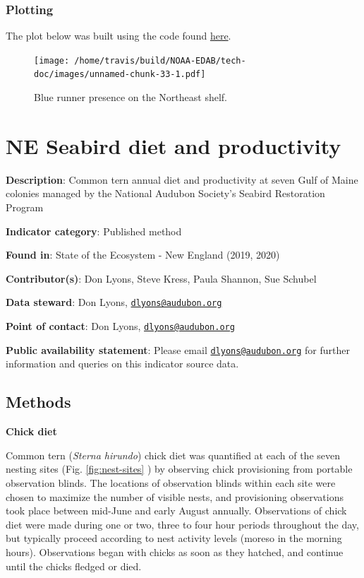 \documentclass[
]{book}
\begin{document}
\hypertarget{plotting-24}{%
\subsection{Plotting}\label{plotting-24}}

The plot below was built using the code found
\href{https://github.com/NOAA-EDAB/ecodata/blob/master/chunk-scripts/macrofauna.Rmd-blue-runner.R}{here}.

\begin{figure}
\centering
\texttt{[image: /home/travis/build/NOAA-EDAB/tech-doc/images/unnamed-chunk-33-1.pdf]}
\caption{\label{fig:unnamed-chunk-33}Blue runner presence on the Northeast shelf.}
\end{figure}

\hypertarget{ne-seabird-diet-and-productivity}{%
\chapter{NE Seabird diet and productivity}\label{ne-seabird-diet-and-productivity}}

\textbf{Description}: Common tern annual diet and productivity at seven Gulf of Maine colonies managed by the National Audubon Society's Seabird Restoration Program

\textbf{Indicator category}: Published method

\textbf{Found in}: State of the Ecosystem - New England (2019, 2020)

\textbf{Contributor(s)}: Don Lyons, Steve Kress, Paula Shannon, Sue Schubel

\textbf{Data steward}: Don Lyons, \href{mailto:dlyons@audubon.org}{\nolinkurl{dlyons@audubon.org}}

\textbf{Point of contact}: Don Lyons, \href{mailto:dlyons@audubon.org}{\nolinkurl{dlyons@audubon.org}}

\textbf{Public availability statement}: Please email \href{mailto:dlyons@audubon.org}{\nolinkurl{dlyons@audubon.org}} for further information and queries on this indicator source data.

\hypertarget{methods-33}{%
\section{Methods}\label{methods-33}}

\textbf{Chick diet}

Common tern (\emph{Sterna hirundo}) chick diet was quantified at each of the seven nesting sites (Fig. \ref{fig:nest-sites} ) by observing chick provisioning from portable observation blinds. The locations of observation blinds within each site were chosen to maximize the number of visible nests, and provisioning observations took place between mid-June and early August annually. Observations of chick diet were made during one or two, three to four hour periods throughout the day, but typically proceed according to nest activity levels (moreso in the morning hours). Observations began with chicks as soon as they hatched, and continue until the chicks fledged or died.
\end{document}
